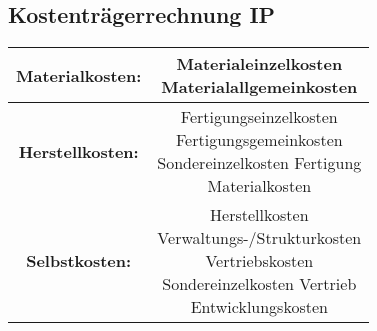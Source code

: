 \subsection{Kostenträgerrechnung \hfill IP}
    \begin{scriptsize}
        \begin{tabular}{|c|c|}
            \hline
            \textbf{Materialkosten:} & \thead{\scriptsize Materialeinzelkosten \\ \scriptsize Materialallgemeinkosten}\\
            \hline
            \textbf{Herstellkosten:} & \thead{\scriptsize Fertigungseinzelkosten \\\scriptsize Fertigungsgemeinkosten \\ \scriptsize Sondereinzelkosten Fertigung \\ \scriptsize Materialkosten}\\
            \hline
            \textbf{Selbstkosten:} & \thead{\scriptsize Herstellkosten \\ \scriptsize Verwaltungs-/Strukturkosten \\ \scriptsize Vertriebskosten \\ \scriptsize Sondereinzelkosten Vertrieb \\ \scriptsize Entwicklungskosten}\\
            \hline
        \end{tabular}
    \end{scriptsize}